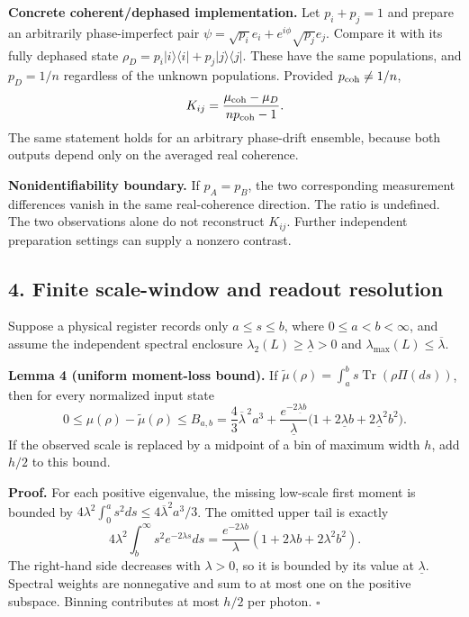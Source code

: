 \documentclass[
  10pt,
  a4paper,
]{article}
\begin{document}
\textbf{Concrete coherent/dephased implementation.} Let \(p_i+p_j=1\) and prepare an arbitrarily phase-imperfect pair \(\psi=\sqrt{p_i}e_i+e^{i\phi}\sqrt{p_j}e_j\). Compare it with its fully dephased state \(\rho_D=p_i|i\rangle\langle i|+p_j|j\rangle\langle j|\). These have the same populations, and \(p_D=1/n\) regardless of the unknown populations. Provided \(p_{\rm coh}\ne 1/n\), \[
K_{ij}=\frac{\mu_{\rm coh}-\mu_D}{np_{\rm coh}-1}.
\] The same statement holds for an arbitrary phase-drift ensemble, because both outputs depend only on the averaged real coherence.

\textbf{Nonidentifiability boundary.} If \(p_A=p_B\), the two corresponding measurement differences vanish in the same real-coherence direction. The ratio is undefined. The two observations alone do not reconstruct \(K_{ij}\). Further independent preparation settings can supply a nonzero contrast.

\subsection{4. Finite scale-window and readout resolution}\label{finite-scale-window-and-readout-resolution}

Suppose a physical register records only \(a\leq s\leq b\), where \(0\leq a<b<\infty\), and assume the independent spectral enclosure \(\lambda_2(L)\geq\underline\lambda>0\) and \(\lambda_{\max}(L)\leq\overline\lambda\).

\textbf{Lemma 4 (uniform moment-loss bound).} If \(\widetilde\mu(\rho)=\int_a^b s\operatorname{Tr}(\rho\Pi(ds))\), then for every normalized input state \[
0\leq\mu(\rho)-\widetilde\mu(\rho)\leq
\boxed{B_{a,b}=\frac43\overline\lambda^{\,2}a^3+
\frac{e^{-2\underline\lambda b}}{\underline\lambda}
\bigl(1+2\underline\lambda b+2\underline\lambda^2b^2\bigr).}
\] If the observed scale is replaced by a midpoint of a bin of maximum width \(h\), add \(h/2\) to this bound.

\textbf{Proof.} For each positive eigenvalue, the missing low-scale first moment is bounded by \(4\lambda^2\int_0^a s^2ds\leq4\overline\lambda^2a^3/3\). The omitted upper tail is exactly \[
4\lambda^2\int_b^\infty s^2e^{-2\lambda s}ds
=\frac{e^{-2\lambda b}}{\lambda}(1+2\lambda b+2\lambda^2b^2).
\] The right-hand side decreases with \(\lambda>0\), so it is bounded by its value at \(\underline\lambda\). Spectral weights are nonnegative and sum to at most one on the positive subspace. Binning contributes at most \(h/2\) per photon. \(\square\)
\end{document}
